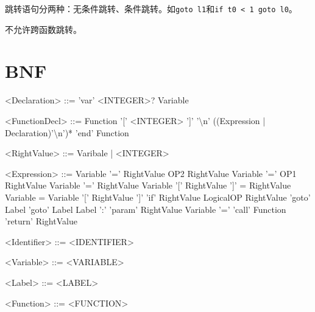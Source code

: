 \documentclass{ctexart}
\newenvironment{typewriterfont}{\ttfamily}{\par}
\begin{document}
跳转语句分两种：无条件跳转、条件跳转。如\texttt{goto l1}和\texttt{if t0 < 1 goto l0}。

不允许跨函数跳转。

\newpage
\section{BNF}
\begin{typewriterfont}
\setlength{\grammarindent}{8em} %
\begin{grammar}
<Declaration> ::= 'var' <INTEGER>? Variable

<FunctionDecl> ::= Function '[' <INTEGER> ']' '\textbackslash n' ((Expression | Declaration)'\textbackslash n')* 'end' Function

<RightValue> ::= Varibale | <INTEGER>

<Expression>	::=	Variable '=' RightValue OP2 RightValue
\alt Variable '=' OP1 RightValue
\alt Variable '=' RightValue
\alt Variable '[' RightValue ']' = RightValue
\alt Variable = Variable '[' RightValue ']'
\alt 'if' RightValue LogicalOP RightValue 'goto' Label
\alt 'goto' Label
\alt Label ':'
\alt 'param' RightValue
\alt Variable '=' 'call' Function
\alt 'return' RightValue


<Identifier>	::=	<IDENTIFIER>

<Variable> ::= <VARIABLE>

<Label> ::= <LABEL>

<Function> ::= <FUNCTION>

\end{grammar}
\end{typewriterfont}
\newpage
\end{document}
